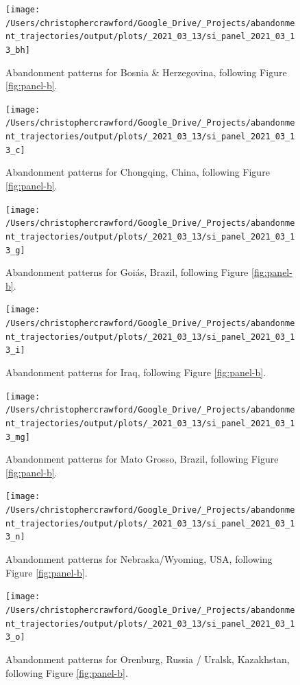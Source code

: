 \documentclass[
]{article}
\begin{document}
\begin{figure}
\texttt{[image: /Users/christophercrawford/Google\_Drive/\_Projects/abandonment\_trajectories/output/plots/\_2021\_03\_13/si\_panel\_2021\_03\_13\_bh]} \caption{Abandonment patterns for Bosnia \& Herzegovina, following Figure \ref{fig:panel-b}.}\label{fig:panel-bh}
\end{figure}

\begin{figure}
\texttt{[image: /Users/christophercrawford/Google\_Drive/\_Projects/abandonment\_trajectories/output/plots/\_2021\_03\_13/si\_panel\_2021\_03\_13\_c]} \caption{Abandonment patterns for Chongqing, China, following Figure \ref{fig:panel-b}.}\label{fig:panel-c}
\end{figure}

\begin{figure}
\texttt{[image: /Users/christophercrawford/Google\_Drive/\_Projects/abandonment\_trajectories/output/plots/\_2021\_03\_13/si\_panel\_2021\_03\_13\_g]} \caption{Abandonment patterns for Goiás, Brazil, following Figure \ref{fig:panel-b}.}\label{fig:panel-g}
\end{figure}

\begin{figure}
\texttt{[image: /Users/christophercrawford/Google\_Drive/\_Projects/abandonment\_trajectories/output/plots/\_2021\_03\_13/si\_panel\_2021\_03\_13\_i]} \caption{Abandonment patterns for Iraq, following Figure \ref{fig:panel-b}.}\label{fig:panel-i}
\end{figure}

\begin{figure}
\texttt{[image: /Users/christophercrawford/Google\_Drive/\_Projects/abandonment\_trajectories/output/plots/\_2021\_03\_13/si\_panel\_2021\_03\_13\_mg]} \caption{Abandonment patterns for Mato Grosso, Brazil, following Figure \ref{fig:panel-b}.}\label{fig:panel-mg}
\end{figure}

\begin{figure}
\texttt{[image: /Users/christophercrawford/Google\_Drive/\_Projects/abandonment\_trajectories/output/plots/\_2021\_03\_13/si\_panel\_2021\_03\_13\_n]} \caption{Abandonment patterns for Nebraska/Wyoming, USA, following Figure \ref{fig:panel-b}.}\label{fig:panel-n}
\end{figure}

\begin{figure}
\texttt{[image: /Users/christophercrawford/Google\_Drive/\_Projects/abandonment\_trajectories/output/plots/\_2021\_03\_13/si\_panel\_2021\_03\_13\_o]} \caption{Abandonment patterns for Orenburg, Russia / Uralsk, Kazakhstan, following Figure \ref{fig:panel-b}.}\label{fig:panel-o}
\end{figure}
\end{document}
